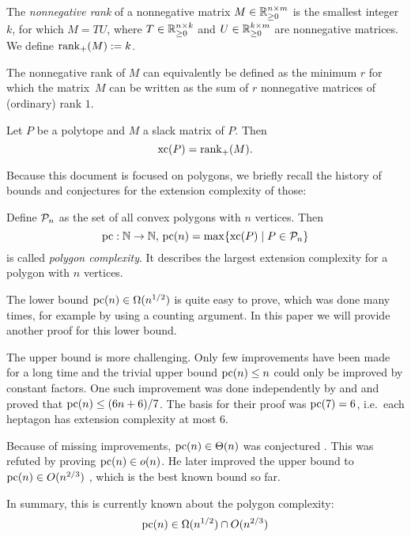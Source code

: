 \begin{definition}
  The \emph{nonnegative rank} of a nonnegative matrix ${M \in \R_{\geq 0}^{n \times m}}$ is the smallest integer $k$, for which $M = TU$, where $T \in \R_{\geq 0}^{n \times k}$ and $U \in \R_{\geq 0}^{k \times m}$ are nonnegative matrices.
  We define $\rank_+(M) := k$.
\end{definition}

The nonnegative rank of $M$ can equivalently be defined as the minimum $r$ for which the matrix~$M$ can be written as the sum of $r$ nonnegative matrices of (ordinary) rank $1$.

\begin{theorem}
  Let $P$ be a polytope and $M$ a slack matrix of $P$. Then $$\xc(P) = \rank_+(M) .$$
\end{theorem}

Because this document is focused on polygons, we briefly recall the history of bounds and conjectures for the extension complexity of those:

Define $\P_n$ as the set of all convex polygons with $n$ vertices. Then $$\pc:\N \to \N,\,\pc(n) = \max \{\xc(P) \mid P \in \P_n\}$$ is called \emph{polygon complexity}. It describes the largest extension complexity for a polygon with $n$ vertices.

The lower bound $\pc(n) \in \Omega(n^{1/2})$ is quite easy to prove, which was done many times, for example by \textcite{fiorini2012extended} using a counting argument. In this paper we will provide another proof for this lower bound.

The upper bound is more challenging. Only few improvements have been made for a long time and the trivial upper bound $\pc(n) \leq n$ could only be improved by constant factors. One such improvement was done independently by \textcite{shitov2014upper} and \textcite{padrol2014polygons} and proved that $\pc(n) \leq (6n+6)/7$. The basis for their proof was $\pc(7)=6$, i.e.\ each heptagon has extension complexity at most 6.

Because of missing improvements, $\pc(n) \in \Theta(n)$ was conjectured \cite{fiorini2012extended}. This was refuted by \textcite{shitov2014sublinear} proving $\pc(n) \in o(n)$. He later improved the upper bound to $\pc(n) \in O(n^{2/3})$ \cite{shitov2020sublinear}, which is the best known bound so far.

In summary, this is currently known about the polygon complexity:
$$\pc(n) \in \Omega(n^{1/2}) \cap O(n^{2/3})$$

